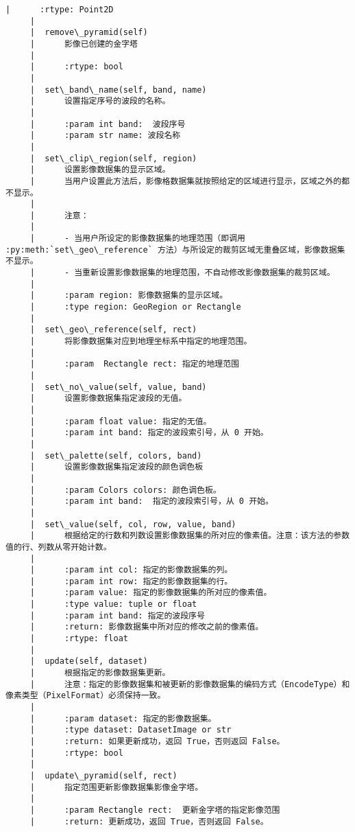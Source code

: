 \documentclass[11pt]{article}
\begin{document}
\begin{Verbatim}[commandchars=\\\{\}]
     |      :rtype: Point2D
     |  
     |  remove\_pyramid(self)
     |      影像已创建的金字塔
     |      
     |      :rtype: bool
     |  
     |  set\_band\_name(self, band, name)
     |      设置指定序号的波段的名称。
     |      
     |      :param int band:  波段序号
     |      :param str name: 波段名称
     |  
     |  set\_clip\_region(self, region)
     |      设置影像数据集的显示区域。
     |      当用户设置此方法后，影像格数据集就按照给定的区域进行显示，区域之外的都不显示。
     |      
     |      注意：
     |      
     |      - 当用户所设定的影像数据集的地理范围（即调用 :py:meth:`set\_geo\_reference` 方法）与所设定的裁剪区域无重叠区域，影像数据集不显示。
     |      - 当重新设置影像数据集的地理范围，不自动修改影像数据集的裁剪区域。
     |      
     |      :param region: 影像数据集的显示区域。
     |      :type region: GeoRegion or Rectangle
     |  
     |  set\_geo\_reference(self, rect)
     |      将影像数据集对应到地理坐标系中指定的地理范围。
     |      
     |      :param  Rectangle rect: 指定的地理范围
     |  
     |  set\_no\_value(self, value, band)
     |      设置影像数据集指定波段的无值。
     |      
     |      :param float value: 指定的无值。
     |      :param int band: 指定的波段索引号，从 0 开始。
     |  
     |  set\_palette(self, colors, band)
     |      设置影像数据集指定波段的颜色调色板
     |      
     |      :param Colors colors: 颜色调色板。
     |      :param int band:  指定的波段索引号，从 0 开始。
     |  
     |  set\_value(self, col, row, value, band)
     |      根据给定的行数和列数设置影像数据集的所对应的像素值。注意：该方法的参数值的行、列数从零开始计数。
     |      
     |      :param int col: 指定的影像数据集的列。
     |      :param int row: 指定的影像数据集的行。
     |      :param value: 指定的影像数据集的所对应的像素值。
     |      :type value: tuple or float
     |      :param int band: 指定的波段序号
     |      :return: 影像数据集中所对应的修改之前的像素值。
     |      :rtype: float
     |  
     |  update(self, dataset)
     |      根据指定的影像数据集更新。
     |      注意：指定的影像数据集和被更新的影像数据集的编码方式（EncodeType）和像素类型（PixelFormat）必须保持一致。
     |      
     |      :param dataset: 指定的影像数据集。
     |      :type dataset: DatasetImage or str
     |      :return: 如果更新成功，返回 True，否则返回 False。
     |      :rtype: bool
     |  
     |  update\_pyramid(self, rect)
     |      指定范围更新影像数据集影像金字塔。
     |      
     |      :param Rectangle rect:  更新金字塔的指定影像范围
     |      :return: 更新成功，返回 True，否则返回 False。

\end{Verbatim}
\end{document}
